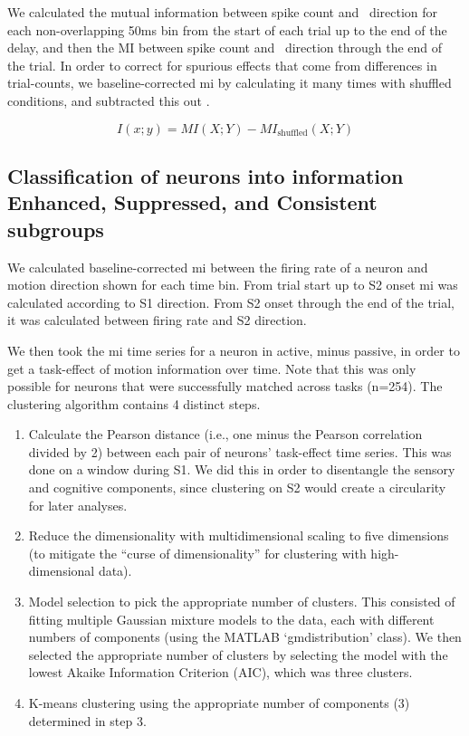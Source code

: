 We calculated the mutual information between spike count and \sample\ direction for each non-overlapping 50ms bin from the start of each trial up to the end of the delay, and then the MI between spike count and \test\ direction through the end of the trial. In order to correct for spurious effects that come from differences in trial-counts, we baseline-corrected \gls{mi} by calculating it many times with shuffled conditions, and subtracted this out \parencite{Hatsopoulos1998}.

\begin{equation}
	I(x;y) = MI(X;Y)- MI_\textrm{shuffled}(X;Y)
\end{equation}


\subsection*{Classification of neurons into information Enhanced, Suppressed, and Consistent subgroups}
We calculated baseline-corrected \gls{mi} between the firing rate of a neuron and motion direction shown for each time bin. From trial start up to S2 onset \gls{mi} was calculated according to S1 direction. From S2 onset through the end of the trial, it was calculated between firing rate and S2 direction. 

We then took the \gls{mi} time series for a neuron in active, minus passive, in order to get a task-effect of motion information over time. Note that this was only possible for neurons that were successfully matched across tasks (n=254). The clustering algorithm contains 4 distinct steps.

\begin{enumerate}
	\item Calculate the Pearson distance (i.e., one minus the Pearson correlation divided by 2) between each pair of neurons' task-effect time series. This was done on a window during S1. We did this in order to disentangle the sensory and cognitive components, since clustering on S2 would create a circularity for later analyses. 
	
	\item Reduce the dimensionality with multidimensional scaling to five dimensions (to mitigate the ``curse of dimensionality'' for clustering with high-dimensional data).
	
	\item Model selection to pick the appropriate number of clusters. This consisted of fitting multiple Gaussian mixture models to the data, each with different numbers of components (using the MATLAB `gmdistribution' class). We then selected the appropriate number of clusters by selecting the model with the lowest Akaike Information Criterion (AIC), which was three clusters.
	
	\item K-means clustering using the appropriate number of components (3) determined in step 3. 
\end{enumerate}

